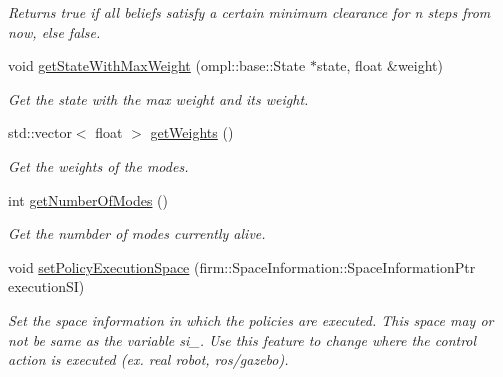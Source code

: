 \begin{DoxyCompactItemize}
\begin{DoxyCompactList}\small\item\em Returns true if all beliefs satisfy a certain minimum clearance for n steps from now, else false. \end{DoxyCompactList}\item 
\hypertarget{class_n_b_m3_p_a99d71409b690633e8090f1333d4ef701}{void \hyperlink{class_n_b_m3_p_a99d71409b690633e8090f1333d4ef701}{get\-State\-With\-Max\-Weight} (ompl\-::base\-::\-State $\ast$state, float \&weight)}\label{class_n_b_m3_p_a99d71409b690633e8090f1333d4ef701}

\begin{DoxyCompactList}\small\item\em Get the state with the max weight and its weight. \end{DoxyCompactList}\item 
\hypertarget{class_n_b_m3_p_ab4e2fe76004cd269d07d94ae5f115b5d}{std\-::vector$<$ float $>$ \hyperlink{class_n_b_m3_p_ab4e2fe76004cd269d07d94ae5f115b5d}{get\-Weights} ()}\label{class_n_b_m3_p_ab4e2fe76004cd269d07d94ae5f115b5d}

\begin{DoxyCompactList}\small\item\em Get the weights of the modes. \end{DoxyCompactList}\item 
\hypertarget{class_n_b_m3_p_a2b33685661e5c331b55e115c3428fdb4}{int \hyperlink{class_n_b_m3_p_a2b33685661e5c331b55e115c3428fdb4}{get\-Number\-Of\-Modes} ()}\label{class_n_b_m3_p_a2b33685661e5c331b55e115c3428fdb4}

\begin{DoxyCompactList}\small\item\em Get the numbder of modes currently alive. \end{DoxyCompactList}\item 
\hypertarget{class_n_b_m3_p_a48e376e8a18712fffcb72e9f5ef05746}{void \hyperlink{class_n_b_m3_p_a48e376e8a18712fffcb72e9f5ef05746}{set\-Policy\-Execution\-Space} (firm\-::\-Space\-Information\-::\-Space\-Information\-Ptr execution\-S\-I)}\label{class_n_b_m3_p_a48e376e8a18712fffcb72e9f5ef05746}

\begin{DoxyCompactList}\small\item\em Set the space information in which the policies are executed. This space may or not be same as the variable si\-\_\-. Use this feature to change where the control action is executed (ex. real robot, ros/gazebo). \end{DoxyCompactList}\end{DoxyCompactItemize}
